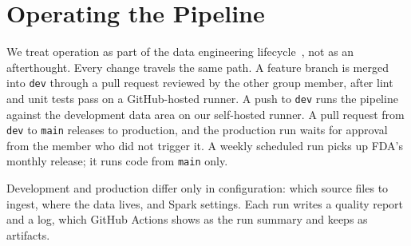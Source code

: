 \section{Operating the Pipeline}
\label{sec:operations}

We treat operation as part of the data engineering lifecycle~\cite{reis2022fundamentals}, not as
an afterthought. Every change travels the same path. A feature branch is merged into \texttt{dev} through a pull
request reviewed by the other group member, after lint and unit tests pass on a GitHub-hosted
runner. A push to \texttt{dev} runs the pipeline against the development data area on our
self-hosted runner. A pull request from \texttt{dev} to \texttt{main} releases to production,
and the production run waits for approval from the member who did not trigger it. A weekly
scheduled run picks up FDA's monthly release; it runs code from \texttt{main} only.

Development and production differ only in configuration: which source files to ingest, where
the data lives, and Spark settings. Each run writes a quality report and a log, which GitHub
Actions shows as the run summary and keeps as artifacts.

